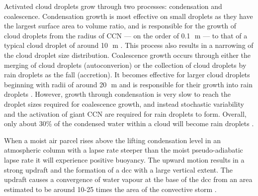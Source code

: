 Activated cloud droplets grow through two processes: condensation and coalescence. 
Condensation growth is most effective on small droplets as they have the largest surface area to volume ratio, and is responsible for the growth of cloud droplets from the radius of CCN --- on the order of 0.1\,\unit{\mu m} --- to that of a typical cloud droplet of around 10\,\unit{\mu m} \citep{cloud_physics}. 
This process also results in a narrowing of the cloud droplet size distribution. 
Coalescence growth occurs through either the merging of cloud droplets (autoconverion) or the collection of cloud droplets by rain droplets as the fall (accretion).
It becomes effective for larger cloud droplets beginning with radii of around 20\,\unit{\mu m} and is responsible for their growth into rain droplets \citep{cloud_physics}.
However, growth through condensation is very slow to reach the droplet sizes required for coalescence growth, and instead stochastic variability and the activation of giant CCN \citep{feingold_impact_1999} are required for rain droplets to form. 
Overall, only about 30\% of the condensed water within a cloud will become rain droplets \citep{trenberth_changing_2003}.

When a moist air parcel rises above the lifting condensation level in an atmospheric column with a lapse rate steeper than the moist pseudo-adiabatic lapse rate it will experience positive buoyancy.
The upward motion results in a strong updraft and the formation of a \acrshort{dcc} with a large vertical extent.
The updraft causes a convergence of water vapour at the base of the \acrshort{dcc} from an area estimated to be around 10-25 times the area of the convective storm \citep{trenberth_changing_2003}.

